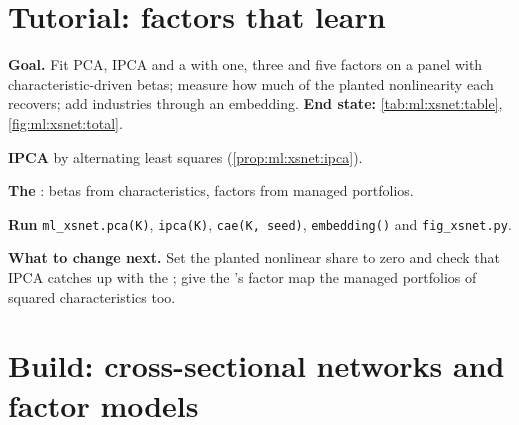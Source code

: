 \section{Tutorial: factors that learn}\label{tut:ml:cross-sectional-deep-models:tut}

\begin{tutorial}
\textbf{Goal.} Fit PCA, IPCA and a  with one, three and five factors on a panel with
characteristic-driven betas; measure how much of the planted nonlinearity each recovers; add industries through an
embedding. \textbf{End state:} \cref{tab:ml:xsnet:table}, \cref{fig:ml:xsnet:total}.
\begin{tutsteps}
\item \textbf{IPCA} by alternating least squares (\cref{prop:ml:xsnet:ipca}).
\label{lst:ml:xsnet:ipca}
\item \textbf{The }: betas from characteristics, factors from managed portfolios.
\label{lst:ml:xsnet:ca}
\item \textbf{Run} \texttt{ml\_xsnet.pca(K)}, \texttt{ipca(K)}, \texttt{cae(K, seed)}, \texttt{embedding()} and
\texttt{fig\_xsnet.py}.
\end{tutsteps}
\textbf{What to change next.} Set the planted nonlinear share to zero and check that IPCA catches up with the
; give the 's factor map the managed portfolios of squared characteristics too.
\end{tutorial}

\section{Build: cross-sectional networks and factor models}\label{bld:ml:cross-sectional-deep-models:xsnet}

